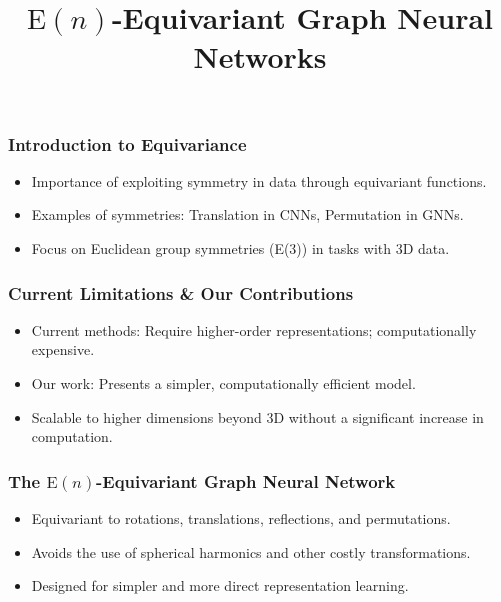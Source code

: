 \documentclass[11pt,xcolor={dvipsnames},hyperref={pdftex,pdfpagemode=UseNone,hidelinks,pdfdisplaydoctitle=true},usepdftitle=false]{beamer}
\newcommand{\En}{\mathrm{E}(n)}
\begin{document}
\title{$\En$-Equivariant \newline Graph Neural Networks}
%
\frame{\titlepage}



\begin{frame}
\frametitle{Introduction to Equivariance}
\begin{itemize}
    \item Importance of exploiting symmetry in data through equivariant functions.
    \item Examples of symmetries: Translation in CNNs, Permutation in GNNs.
    \item Focus on Euclidean group symmetries (E(3)) in tasks with 3D data.
\end{itemize}
\end{frame}

\begin{frame}
\frametitle{Current Limitations \& Our Contributions}
\begin{itemize}
    \item Current methods: Require higher-order representations; computationally expensive.
    \item Our work: Presents a simpler, computationally efficient model.
    \item Scalable to higher dimensions beyond 3D without a significant increase in computation.
\end{itemize}
\end{frame}

\begin{frame}
\frametitle{The $\En$-Equivariant Graph Neural Network}
\begin{itemize}
    \item Equivariant to rotations, translations, reflections, and permutations.
    \item Avoids the use of spherical harmonics and other costly transformations.
    \item Designed for simpler and more direct representation learning.
\end{itemize}
\end{frame}
\end{document}
